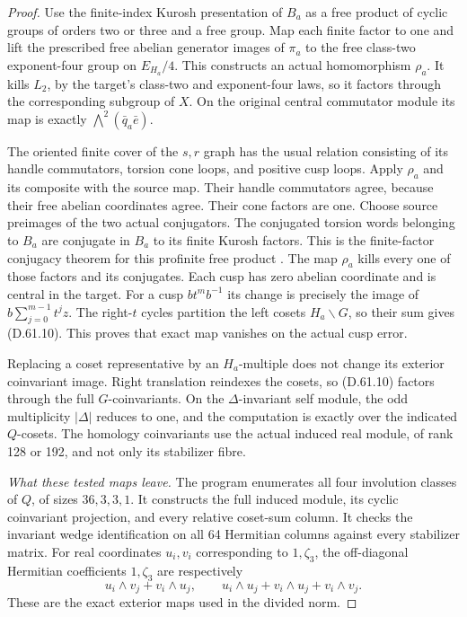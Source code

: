 \begin{proof}
Use the finite-index Kurosh
presentation of \(B_a\) as
a free product of cyclic
groups of orders two or three
and a free group. Map each
finite factor to one and
lift the prescribed free
abelian generator images of
\(\pi_a\) to the free
class-two exponent-four group
on \(E_{H_a}/4\). This
constructs an actual homomorphism
\(\rho_a\). It kills
\(L_2\), by the target's
class-two and exponent-four
laws, so it factors through
the corresponding subgroup
of \(X\). On the original
central commutator module its
map is exactly
\(\bigwedge^2(\bar q_a\bar e)\).

The oriented finite cover
of the \(s,r\) graph has
the usual relation consisting
of its handle commutators,
torsion cone loops, and
positive cusp loops. Apply
\(\rho_a\) and its composite
with the source map. Their
handle commutators agree,
because their free abelian
coordinates agree. Their
cone factors are one. Choose source
preimages of the two actual conjugators.
The conjugated torsion words belonging
to \(B_a\) are conjugate in \(B_a\)
to its finite Kurosh factors. This is
the finite-factor conjugacy theorem
for this profinite free product
\cite[Theorem A$'$]{A_HerfortRibes1985}.
The map \(\rho_a\) kills every one
of those factors and its conjugates.
Each cusp has zero
abelian coordinate and is
central in the target.
For a cusp \(bt^m b^{-1}\)
its change is precisely the
image of \(b\sum_{j=0}^{m-1}t^jz\).
The right-\(t\) cycles partition
the left cosets \(H_a\backslash G\),
so their sum gives (D.61.10).
This proves that exact map
vanishes on the actual cusp
error.

Replacing a coset representative
by an \(H_a\)-multiple does
not change its exterior
coinvariant image. Right
translation reindexes the
cosets, so (D.61.10) factors
through the full \(G\)-coinvariants.
On the \(\Delta\)-invariant
self module, the odd multiplicity
\(|\Delta|\) reduces to one,
and the computation is exactly
over the indicated \(Q\)-cosets.
The homology coinvariants use
the actual induced real module,
of rank 128 or 192, and not
only its stabilizer fibre.

\emph{What these tested maps leave.}
The program
enumerates all four involution
classes of \(Q\), of sizes
\(36,3,3,1\). It constructs
the full induced module, its
cyclic coinvariant projection,
and every relative coset-sum
column. It checks the invariant
wedge identification on all
64 Hermitian columns against
every stabilizer matrix. For
real coordinates \(u_i,v_i\)
corresponding to \(1,\zeta_3\),
the off-diagonal Hermitian
coefficients \(1,\zeta_3\)
are respectively
\[
 u_i\wedge v_j+v_i\wedge u_j,
 \qquad
 u_i\wedge u_j+v_i\wedge u_j+v_i\wedge v_j.
 \tag{D.61.21}
\]
These are the exact exterior
maps used in the divided norm.


\end{proof}
